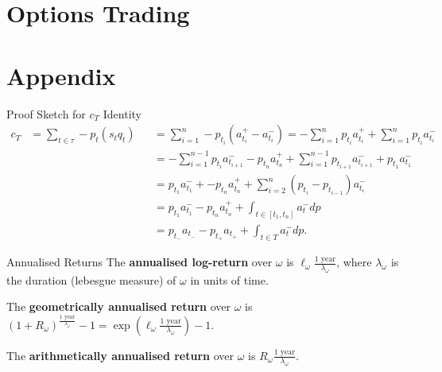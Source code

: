\documentclass{beamer}
\begin{document}
\section{Options Trading}



\section{Appendix}
\begin{frame}{Proof Sketch for $c_T$ Identity}
	\begin{align*}
			c_{T}	&= \sum_{t\in\tau} - p_t (s_t q_t)	&&= \sum_{i=1}^n - p_{t_i} (a_{t_i}^+-a_{t_i}^-) = - \sum_{i=1}^n p_{t_i} a_{t_i}^+ + \sum_{i=1}^n p_{t_i} a_{t_i}^-
		\\		&					&&= - \sum_{i=1}^{n-1} p_{t_i} a_{t_{i+1}}^- - p_{t_n} a_{t_n}^+ + \sum_{i=1}^{n-1} p_{t_{i+1}} a_{t_{i+1}}^- + p_{t_1}a_{t_1}^-
		\\		&					&&= p_{t_1}a_{t_1}^- + - p_{t_n} a_{t_n}^+ + \sum_{i=2}^n (p_{t_i}-p_{t_{i-1}}) a_{t_i}^-
		\\		&					&&= p_{t_1}a_{t_1}^- - p_{t_n}a_{t_n}^+ + \int_{t\in[t_1,t_n]} a_t^- dp
		\\		&					&&= p_{t_-}a_{t_-} - p_{t_+}a_{t_+} + \int_{t\in T} a_t^- dp.
	\end{align*}
\end{frame}

\begin{frame}{Annualised Returns}
	The \textbf{annualised log-return} over $\omega$ is $\ell_\omega \frac{\textrm{1 year}}{\lambda_\omega}$, where $\lambda_\omega$ is the duration (lebesgue measure) of $\omega$ in units of time.%

	The \textbf{geometrically annualised return} over $\omega$ is $(1 + R_\omega)^\frac{\textrm{1 year}}{\lambda_\omega} - 1 = \exp\left(\ell_\omega \frac{\textrm{1 year}}{\lambda_\omega}\right) - 1$.

	The \textbf{arithmetically annualised return} over $\omega$ is $R_\omega \frac{\textrm{1 year}}{\lambda_\omega}$. %

\end{frame}
\end{document}
